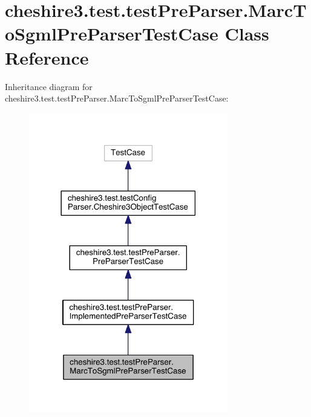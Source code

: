 \hypertarget{classcheshire3_1_1test_1_1test_pre_parser_1_1_marc_to_sgml_pre_parser_test_case}{\section{cheshire3.\-test.\-test\-Pre\-Parser.\-Marc\-To\-Sgml\-Pre\-Parser\-Test\-Case Class Reference}
\label{classcheshire3_1_1test_1_1test_pre_parser_1_1_marc_to_sgml_pre_parser_test_case}
}


Inheritance diagram for cheshire3.\-test.\-test\-Pre\-Parser.\-Marc\-To\-Sgml\-Pre\-Parser\-Test\-Case\-:
\nopagebreak
\begin{figure}[H]
\begin{center}
\leavevmode
\includegraphics[width=246pt]{classcheshire3_1_1test_1_1test_pre_parser_1_1_marc_to_sgml_pre_parser_test_case__inherit__graph}
\end{center}
\end{figure}


